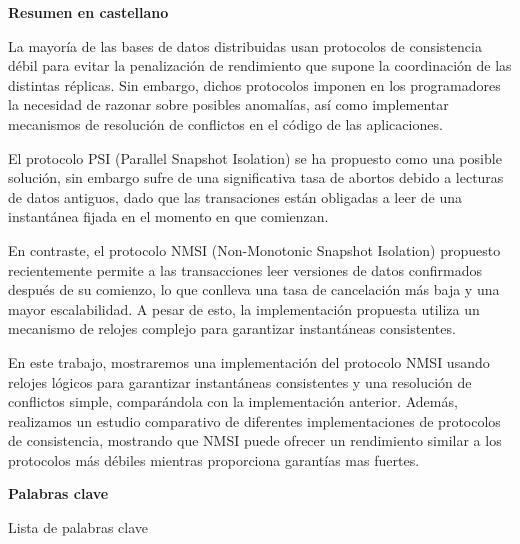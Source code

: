 \newpage
\thispagestyle{empty}

\begin{center}
{\bf \Huge Resumen en castellano}
\end{center}

\vspace{1cm}

La mayoría de las bases de datos distribuidas usan protocolos de consistencia débil
para evitar la penalización de rendimiento que supone la coordinación de las distintas
réplicas. Sin embargo, dichos protocolos imponen en los programadores la necesidad de
razonar sobre posibles anomalías, así como implementar mecanismos de resolución de
conflictos en el código de las aplicaciones.

El protocolo PSI (Parallel Snapshot Isolation) se ha propuesto como una posible solución,
sin embargo sufre de una significativa tasa de abortos debido a lecturas de datos antiguos,
dado que las transaciones están obligadas a leer de una instantánea fijada en el momento
en que comienzan.

En contraste, el protocolo NMSI (Non-Monotonic Snapshot Isolation) propuesto recientemente
permite a las transacciones leer versiones de datos confirmados después de su comienzo,
lo que conlleva una tasa de cancelación más baja y una mayor escalabilidad. A pesar de esto,
la implementación propuesta utiliza un mecanismo de relojes complejo para garantizar instantáneas
consistentes.

En este trabajo, mostraremos una implementación del protocolo NMSI usando relojes lógicos
para garantizar instantáneas consistentes y una resolución de conflictos simple, comparándola
con la implementación anterior. Además, realizamos un estudio comparativo de diferentes
implementaciones de protocolos de consistencia, mostrando que NMSI puede ofrecer un rendimiento
similar a los protocolos más débiles mientras proporciona garantías mas fuertes.

\vspace{1cm}

\begin{center}
{\bf \Large Palabras clave}
\end{center}

\vspace{0.5cm}

Lista de palabras clave
